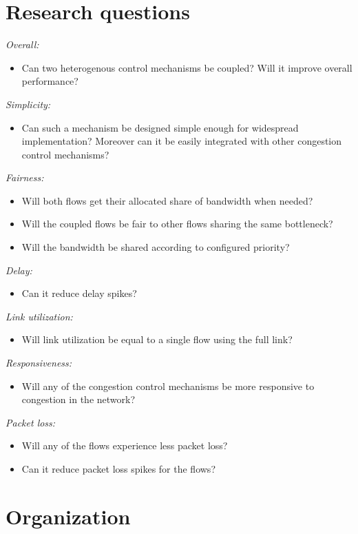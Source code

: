 \documentclass[UKenglish]{ifimaster}
\begin{document}
\section{Research questions}
\emph{Overall:}
\begin{itemize}
    \item Can two heterogenous control mechanisms be coupled? Will it improve overall performance?
\end{itemize}
\emph{Simplicity:}
\begin{itemize}
    \item Can such a mechanism be designed simple enough for widespread implementation? Moreover can it be easily integrated with other congestion control mechanisms? 
\end{itemize}
\emph{Fairness:}
\begin{itemize}
    \item Will both flows get their allocated share of bandwidth when needed?
    \item Will the coupled flows be fair to other flows sharing the same bottleneck?
    \item Will the bandwidth be shared according to configured priority?
\end{itemize}
\emph{Delay:}
\begin{itemize}
    \item Can it reduce delay spikes?
\end{itemize}
\emph{Link utilization:}
\begin{itemize}
    \item Will link utilization be equal to a single flow using the full link?
\end{itemize}
\emph{Responsiveness:}
\begin{itemize}
    \item Will any of the congestion control mechanisms be more responsive to congestion in the network?
\end{itemize}
\emph{Packet loss:}
\begin{itemize}
    \item Will any of the flows experience less packet loss?
    \item Can it reduce packet loss spikes for the flows?
\end{itemize}

\section{Organization}
\end{document}
